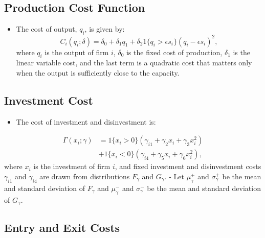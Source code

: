 \documentclass[
]{book}
\providecommand{\tightlist}{%
  \setlength{\itemsep}{0pt}\setlength{\parskip}{0pt}}
\begin{document}
\hypertarget{production-cost-function}{%
\subsection{Production Cost Function}\label{production-cost-function}}

\begin{itemize}
\tightlist
\item
  The cost of output, \(q_i\), is given by:
  \begin{equation}
  C_i(q_i; \delta) = \delta_0 + \delta_1 q_1 + \delta_2 1\{q_i > \epsilon s_i\}(q_i - \epsilon s_i)^2,
  \end{equation}
  where \(q_i\) is the output of firm \(i\), \(\delta_0\) is the fixed cost of production, \(\delta_1\) is the linear variable cost, and the last term is a quadratic cost that matters only when the output is sufficiently close to the capacity.
\end{itemize}

\hypertarget{investment-cost}{%
\subsection{Investment Cost}\label{investment-cost}}

\begin{itemize}
\tightlist
\item
  The cost of investment and disinvestment is:
\end{itemize}

\begin{equation}
\begin{split}
\Gamma(x_i; \gamma) &= 1\{x_i > 0\}(\gamma_{i1} + \gamma_2 x_i + \gamma_3 x_i^2)\\
& + 1\{x_i < 0\}(\gamma_{i4} + \gamma_{5} x_i + \gamma_6 x_i^2),
\end{split}
\end{equation}
where \(x_i\) is the investment of firm \(i\), and fixed investment and disinvestment costs \(\gamma_{i1}\) and \(\gamma_{i4}\) are drawn from distributions \(F_{\gamma}\) and \(G_{\gamma}\).
- Let \(\mu_\gamma^+\) and \(\sigma_\gamma^+\) be the mean and standard deviation of \(F_\gamma\) and \(\mu_\gamma^-\) and \(\sigma_\gamma^-\) be the mean and standard deviation of \(G_\gamma\).

\hypertarget{entry-and-exit-costs}{%
\subsection{Entry and Exit Costs}\label{entry-and-exit-costs}}
\end{document}
